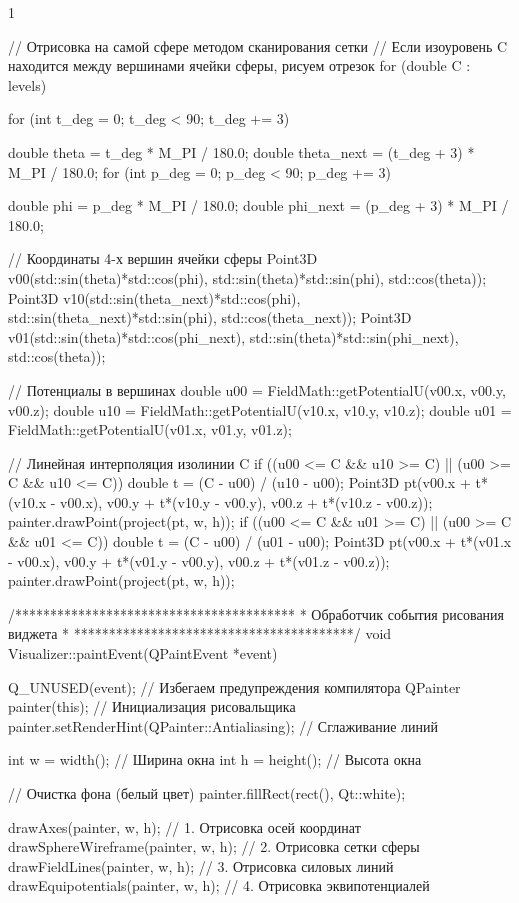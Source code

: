 \begin{listing}{1}
{  // Отрисовка на самой сфере методом сканирования сетки
  // Если изоуровень C находится между вершинами ячейки сферы, рисуем отрезок
  for (double C : levels) {
    for (int t_deg = 0; t_deg < 90; t_deg += 3) {
      double theta = t_deg * M_PI / 180.0;
      double theta_next = (t_deg + 3) * M_PI / 180.0;
      for (int p_deg = 0; p_deg < 90; p_deg += 3) {
        double phi = p_deg * M_PI / 180.0;
        double phi_next = (p_deg + 3) * M_PI / 180.0;

        // Координаты 4-х вершин ячейки сферы
        Point3D v00(std::sin(theta)*std::cos(phi), std::sin(theta)*std::sin(phi), std::cos(theta));
        Point3D v10(std::sin(theta_next)*std::cos(phi), std::sin(theta_next)*std::sin(phi), std::cos(theta_next));
        Point3D v01(std::sin(theta)*std::cos(phi_next), std::sin(theta)*std::sin(phi_next), std::cos(theta));

        // Потенциалы в вершинах
        double u00 = FieldMath::getPotentialU(v00.x, v00.y, v00.z);
        double u10 = FieldMath::getPotentialU(v10.x, v10.y, v10.z);
        double u01 = FieldMath::getPotentialU(v01.x, v01.y, v01.z);

        // Линейная интерполяция изолинии C
        if ((u00 <= C && u10 >= C) || (u00 >= C && u10 <= C)) {
          double t = (C - u00) / (u10 - u00);
          Point3D pt(v00.x + t*(v10.x - v00.x), v00.y + t*(v10.y - v00.y), v00.z + t*(v10.z - v00.z));
          painter.drawPoint(project(pt, w, h));
        }
        if ((u00 <= C && u01 >= C) || (u00 >= C && u01 <= C)) {
          double t = (C - u00) / (u01 - u00);
          Point3D pt(v00.x + t*(v01.x - v00.x), v00.y + t*(v01.y - v00.y), v00.z + t*(v01.z - v00.z));
          painter.drawPoint(project(pt, w, h));
        }
      }
    }
  }
}

/****************************************
* Обработчик события рисования виджета  *
****************************************/
void Visualizer::paintEvent(QPaintEvent *event) {
  Q_UNUSED(event); // Избегаем предупреждения компилятора
  QPainter painter(this); // Инициализация рисовальщика
  painter.setRenderHint(QPainter::Antialiasing); // Сглаживание линий

  int w = width(); // Ширина окна
  int h = height(); // Высота окна

  // Очистка фона (белый цвет)
  painter.fillRect(rect(), Qt::white);

  drawAxes(painter, w, h); // 1. Отрисовка осей координат
  drawSphereWireframe(painter, w, h); // 2. Отрисовка сетки сферы
  drawFieldLines(painter, w, h); // 3. Отрисовка силовых линий
  drawEquipotentials(painter, w, h); // 4. Отрисовка эквипотенциалей
}


\end{listing}
